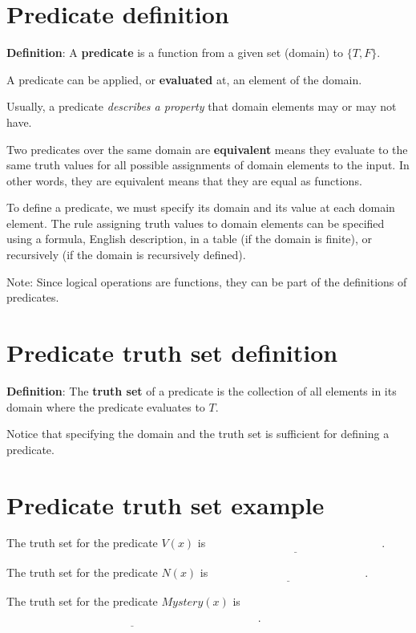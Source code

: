 \documentclass[12pt, oneside]{article}
\begin{document}
\begin{flushright}
\end{flushright} \section*{Predicate definition}


{\bf  Definition}: A  {\bf predicate}  is  a function from a given set (domain) to $\{T,F\}$.

A predicate can be applied, or {\bf evaluated} at, an element of the domain.

Usually, a predicate {\it describes a  property} that domain elements may or may not have.

Two predicates over the same domain are {\bf equivalent} means they evaluate to
the same truth values for all possible assignments of domain elements to the
input. In other words, they are equivalent means that they are equal as functions.

To define a predicate, we must specify its domain and its value at each domain element.
The rule assigning truth values to domain elements can be specified using a formula, 
English description, in a table (if the domain is finite), or recursively (if the domain is recursively
defined).

Note: Since logical operations are functions, they can be part of the definitions of predicates. \vfill
\section*{Predicate truth set definition}


{\bf Definition}: The {\bf truth  set} of a  predicate is the collection of all elements in its
domain where the predicate evaluates to $T$.

Notice that specifying the domain and the truth set is sufficient for defining
a predicate. \vfill
\section*{Predicate truth set example}


The truth set for the predicate $V(x)$ is $\underline{\phantom{\{ x ~\mid~ V(x) = T\} = \{ 001, 010, 011 \}}}$.

The truth set for the predicate $N(x)$ is $\underline{\phantom{\{ x ~\mid~ N(x) = T\} = \{ 101, 111 \}}}$.

The truth set for the predicate $Mystery(x)$ is $\underline{\phantom{\{ x ~\mid~ Mystery(x) = T\} = \{ 000, 001, 010, 101, 111 \}}}$.
\end{document}

